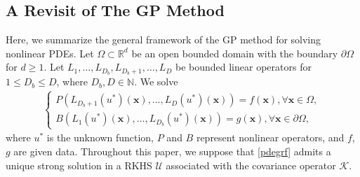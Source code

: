 \documentclass[10pt,reqno]{amsart}
\newcommand{\1}{{\chi}}
\def\leq{\leqslant}
\def\geq{\geqslant}
\numberwithin{equation}{section}
\theoremstyle{thmlemcorr}
\numberwithin{theorem}{section}
\theoremstyle{thmlemcorr*}
\theoremstyle{defi}
\theoremstyle{remexample}
\theoremstyle{ass}
\begin{document}
\subsection{A Revisit of The GP Method}
\label{subsecRevisit}
Here, we summarize the general framework of the GP method \cite{chen2021solving} for solving nonlinear PDEs. 
Let $\Omega\subset\mathbb{R}^d$ be an open bounded domain with the boundary $\partial \Omega$ for $d\geq 1$. Let $L_1,\dots, L_{D_b}, L_{D_b+1}, \dots, L_D$ be bounded linear operators for $1\leq D_b\leq D$, where $D_b, D\in \mathbb{N}$. We solve
\begin{align}
	\label{pdegrf}
	\begin{cases}
		{P}(L_{D_b+1}(u^*)(\boldsymbol{x}),\dots, L_D(u^*)(\boldsymbol{x})) = f(\boldsymbol{x}), \forall \boldsymbol{x}\in \Omega,\\
		{B}(L_1(u^*)(\boldsymbol{x}),\dots, L_{D_b}(u^*)(\boldsymbol{x})) = g(\boldsymbol{x}), \forall \boldsymbol{x}\in \partial \Omega,
	\end{cases}
\end{align}
where $u^*$ is the unknown function, $P$ and $B$ represent nonlinear operators, and $f$, $g$ are given data. Throughout this paper, we suppose that \eqref{pdegrf} admits a unique strong solution in a RKHS $\mathcal{U}$ associated with the covariance operator $\mathcal{K}$. 
\end{document}
